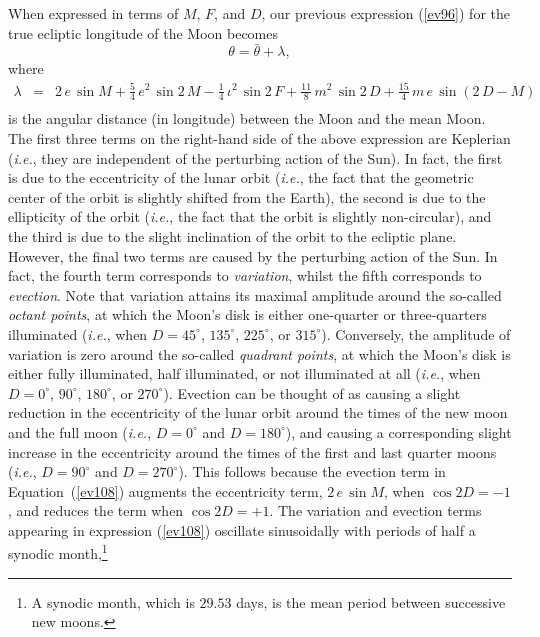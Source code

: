   When expressed in terms of $M$, $F$, and $D$, our previous expression (\ref{ev96}) for the true ecliptic
  longitude of the Moon becomes
  \begin{equation}
  \theta = \bar{\theta}+\lambda,
  \end{equation}
  where
  \begin{eqnarray}\label{ev108}
   \lambda &=&  2\,e\,\sin M+ \frac{5}{4}\,e^2\,\sin 2\,M
- \frac{1}{4}\,\iota^2\,\sin 2\,F+ \frac{11}{8}\,m^2\,\sin 2\,D+\frac{15}{4}\,m\,e\,\sin(2\,D-M)\nonumber\\[0.5ex]&&
\end{eqnarray}
is the angular distance (in longitude) between the Moon and the mean Moon. The first three terms on the
right-hand side of the above expression are Keplerian ({\em i.e.}, they are independent of the perturbing
action of the Sun). In fact, the first is due to the eccentricity of the lunar orbit ({\em i.e.}, the fact that the
geometric center of the orbit is slightly shifted from the Earth),  the second is due to
the ellipticity of the orbit ({\em i.e.}, the fact that the orbit is slightly non-circular), and the third
is due to the slight inclination of the  orbit to the ecliptic plane. However, the final two
terms are caused by the perturbing action of the Sun. In fact, the fourth term corresponds to
{\em variation}, whilst the fifth corresponds to {\em evection}. Note that variation attains its maximal
amplitude around the so-called {\em octant points}, at which the
Moon's disk  is either one-quarter or three-quarters illuminated ({\em i.e.}, when $D=45^\circ$, $135^\circ$, 
$225^\circ$, or $315^\circ$). Conversely, the amplitude of variation is zero around the so-called {\em quadrant points},
at which  the Moon's disk is either fully illuminated, half illuminated, or not illuminated at all ({\em i.e.}, when $D=0^\circ$, $90^\circ$, 
$180^\circ$, or $270^\circ$). Evection can be thought of as causing a slight reduction in the eccentricity of the lunar
orbit around the times of the new moon and the full moon ({\em i.e.}, $D=0^\circ$ and $D=180^\circ$), and
causing a corresponding slight increase in the eccentricity around the times of the first and last quarter moons
 ({\em i.e.}, $D=90^\circ$ and $D=270^\circ$). This follows because the evection term in Equation~(\ref{ev108}) augments the eccentricity
 term, $2\,e\,\sin M$, when $\cos 2D=-1$, and reduces the term when $\cos 2D = +1$.
 The variation and evection terms appearing in expression (\ref{ev108}) oscillate sinusoidally with periods of half a synodic month,\footnote{A
 synodic month, which is $29.53$ days, is the mean period between successive new moons.}
